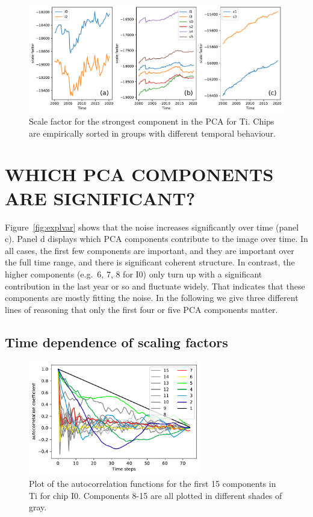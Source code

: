 \documentclass[]{spie}  %
\begin{document}
\begin{figure} [ht]
  \begin{center}
    \includegraphics[width=\textwidth]{figures/comparechips.pdf}
  \end{center}
  \caption
      {Scale factor for the strongest component in the PCA for Ti. Chips are empirically sorted in groups with different temporal behaviour.
      \label{fig:comparechips}}
\end{figure}


\section{WHICH PCA COMPONENTS ARE SIGNIFICANT?}

Figure~\ref{fig:explvar} shows that the noise increases significantly over time (panel c). Panel d displays which PCA components contribute to the image over time. In all cases, the first few components are important, and they are important over the full time range, and there is significant coherent structure. In contrast, the higher components (e.g.\ 6, 7, 8 for I0) only turn up with a significant contribution in the last year or so and fluctuate widely. That indicates that these components are mostly fitting the noise. In the following we give three different lines of reasoning that only the first four or five PCA components matter.


\subsection{Time dependence of scaling factors}
\begin{figure} [ht]
  \begin{center}
    \includegraphics[height=5cm]{figures/autocorr.pdf}
  \end{center}
  \caption
      {Plot of the autocorrelation functions for the first 15 components in Ti for chip I0. Components 8-15 are all plotted in different shades of gray.
        \label{fig:time}}
\end{figure}
\end{document}
